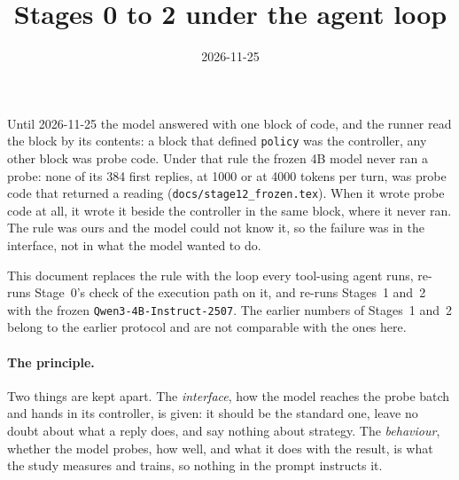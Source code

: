 \documentclass[11pt,a4paper]{article}
\title{\textbf{Stages 0 to 2 under the agent loop}}
\author{}
\date{2026-11-25}
\begin{document}
\maketitle

\noindent
Until 2026-11-25 the model answered with one block of code, and the runner
read the block by its contents: a block that defined \texttt{policy} was the
controller, any other block was probe code. Under that rule the frozen 4B
model never ran a probe: none of its 384 first replies, at 1000 or at 4000
tokens per turn, was probe code that returned a reading
(\texttt{docs/stage12\_frozen.tex}). When it wrote probe code at all, it wrote
it beside the controller in the same block, where it never ran. The rule was
ours and the model could not know it, so the failure was in the interface,
not in what the model wanted to do.

This document replaces the rule with the loop every tool-using agent runs,
re-runs Stage~0's check of the execution path on it, and re-runs Stages~1
and~2 with the frozen \texttt{Qwen3-4B-Instruct-2507}. The earlier numbers
of Stages~1 and~2 belong to the earlier protocol and are not comparable
with the ones here.

\paragraph{The principle.} Two things are kept apart. The \emph{interface},
how the model reaches the probe batch and hands in its controller, is given:
it should be the standard one, leave no doubt about what a reply does, and
say nothing about strategy. The \emph{behaviour}, whether the model probes,
how well, and what it does with the result, is what the study measures and
trains, so nothing in the prompt instructs it.
\end{document}
